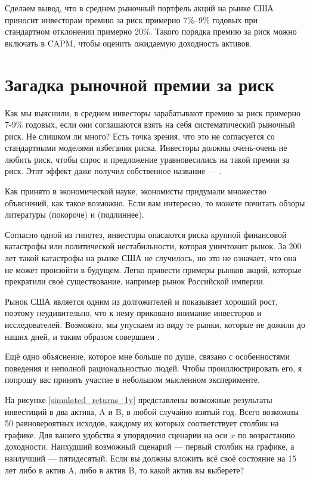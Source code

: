 Сделаем вывод, что в среднем рыночный портфель акций на рынке США приносит инвесторам премию за риск примерно 7\%--9\% годовых при стандартном отклонении примерно 20\%. Такого порядка премию за риск можно включать в CAPM, чтобы оценить ожидаемую доходность активов.

\section*{Загадка рыночной премии за риск}

Как мы выяснили, в среднем инвесторы зарабатывают премию за риск примерно 7-9\%  годовых, если они соглашаются взять на себя систематический рыночный риск. Не слишком ли много? Есть точка зрения, что это не согласуется со стандартными моделями избегания риска. Инвесторы должны очень-очень не любить риск, чтобы спрос и предложение уравновесились на такой премии за риск. Этот эффект даже получил собственное название --- .

Как принято в экономической науке, экономисты придумали множество объяснений, как такое возможно. Если вам интересно, то можете почитать обзоры литературы \cite{siegel1997anomalies} (покороче) и \cite{mehra2007equity} (подлиннее).

Согласно одной из гипотез, инвесторы опасаются риска крупной финансовой катастрофы или политической нестабильности, которая уничтожит рынок. За 200 лет такой катастрофы на рынке США не случилось, но это не означает, что она не может произойти в будущем. Легко привести примеры рынков акций, которые прекратили своё существование, например рынок Российской империи.

Рынок США является одним из долгожителей и показывает хороший рост, поэтому неудивительно, что к нему приковано внимание инвесторов и исследователей. Возможно, мы упускаем из виду те рынки, которые не дожили до наших дней, и таким образом совершаем .

Ещё одно объяснение, которое мне больше по душе, связано с особенностями поведения и неполной рациональностью людей. Чтобы проиллюстрировать его, я попрошу вас принять участие в небольшом мысленном эксперименте.

На рисунке \ref{simulated_returns_1y} представлены возможные результаты
инвестиций в два актива, A и B, в любой случайно взятый год. Всего возможны 50
равновероятных исходов, каждому их которых соответствует столбик на графике. Для
вашего удобства я упорядочил сценарии на оси $x$ по возрастанию доходности.
Наихудший возможный сценарий --- первый столбик на графике, а наилучший ---
пятидесятый. Если вы должны вложить всё своё состояние на 15 лет либо в актив A,
либо в актив B, то какой актив вы выберете?

